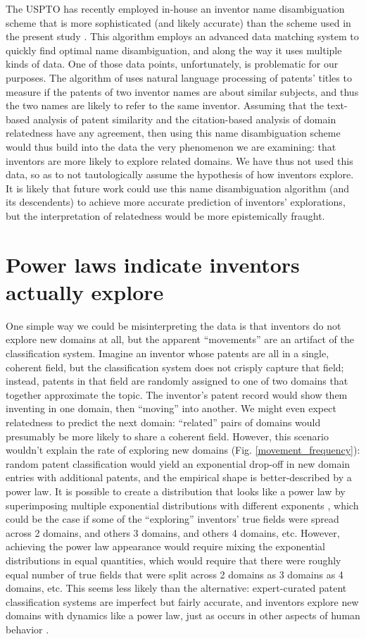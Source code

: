 \documentclass{dsj}
\begin{document}
The USPTO has recently employed in-house an inventor name disambiguation scheme that is more sophisticated (and likely accurate) than the scheme used in the present study \cite{Monath2015}. This algorithm employs an advanced data matching system to quickly find optimal name disambiguation, and along the way it uses multiple kinds of data. One of those data points, unfortunately, is problematic for our purposes. The algorithm of \cite{Monath2015} uses natural language processing of patents' titles to measure if the patents of two inventor names are about similar subjects, and thus the two names are likely to refer to the same inventor. Assuming that the text-based analysis of patent similarity and the citation-based analysis of domain relatedness have any agreement, then using this name disambiguation scheme would thus build into the data the very phenomenon we are examining: that inventors are more likely to explore related domains. We have thus not used this data, so as to not tautologically assume the hypothesis of how inventors explore. It is likely that future work could use  this name disambiguation algorithm (and its descendents) to achieve more accurate prediction of inventors' explorations, but the interpretation of relatedness would be more epistemically fraught. 

\section{Power laws indicate inventors actually explore}
One simple way we could be misinterpreting the data is that inventors do not explore new domains at all, but the apparent ``movements'' are an artifact of the classification system. Imagine an inventor whose patents are all in a single, coherent field, but the classification system does not crisply capture that field; instead, patents in that field are randomly assigned to one of two domains that together approximate the topic. The inventor's patent record would show them inventing in one domain, then ``moving'' into another. We might even expect relatedness to predict the next domain: ``related'' pairs of domains would presumably be more likely to share a coherent field. However, this scenario wouldn't explain the rate of exploring new domains (Fig. \ref{movement_frequency}): random patent classification would yield an exponential drop-off in new domain entries with additional patents, and the empirical shape is better-described by a power law. It is possible to create a distribution that looks like a power law by superimposing multiple exponential distributions with different exponents \cite{Chu-Shore2010}, which could be the case if some of the ``exploring'' inventors' true fields were spread across 2 domains, and others 3 domains, and others 4 domains, etc. However, achieving the power law appearance would require mixing the exponential distributions in equal quantities, which would require that there were roughly equal number of true fields that were split across 2 domains as 3 domains as 4 domains, etc. This seems less likely than the alternative: expert-curated patent classification systems are imperfect but fairly accurate, and inventors explore new domains with dynamics like a power law, just as occurs in other aspects of human behavior \cite{Deville2016}.
\end{document}
